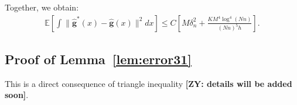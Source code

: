 \documentclass[preprint,11pt]{article}
\newcommand{\mbb}{\mathbb}
\newcommand{\zy}[1]{{\color{red}\bf[ZY: #1]}}
\numberwithin{equation}{section}
\begin{document}
Together, we obtain:
\begin{align*}
    \mbb{E}\left[\int \|\bm{\widehat{g}}^*(x)-\widehat{\bm{g}}(x)\|^2dx\right]\le C\left[M\delta_n^2+\frac{KM^4\log^4(Nn)}{(Nn)^5h}\right].
\end{align*}

\iffalse
\subsection{Proof of Lemma~\ref{lem:error31}}
This is a direct consequence of triangle inequality \zy{details will be added soon}.
\end{document}

